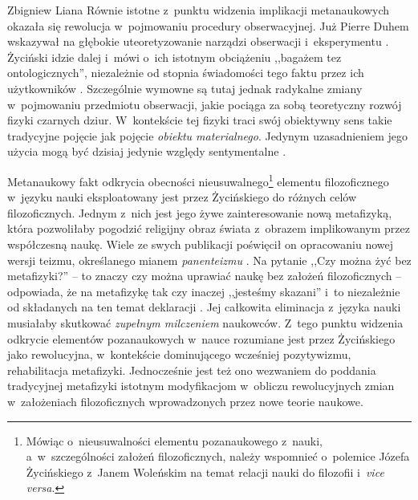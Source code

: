 \begin{artplenv}{Zbigniew Liana}
Równie istotne z~punktu widzenia implikacji metanaukowych okazała się rewolucja w~pojmowaniu procedury obserwacyjnej.
Już Pierre Duhem wskazywał na głębokie uteoretyzowanie narządzi obserwacji i~eksperymentu
\parencite[zob.][s.~77–81; 85–89]{duhem_pierre_1991}.
Życiński idzie dalej i~mówi o~ich istotnym
obciążeniu ,,bagażem tez ontologicznych'', niezależnie od stopnia świadomości tego faktu przez ich użytkowników
\parencite[s.~249]{zycinski_jezyk_1983}.
 Szczególnie wymowne są tutaj jednak radykalne zmiany w~pojmowaniu
przedmiotu obserwacji, jakie pociąga za sobą teoretyczny rozwój fizyki czarnych dziur. W~kontekście tej fizyki traci
swój obiektywny sens takie tradycyjne pojęcie jak pojęcie \textit{obiektu materialnego}. Jedynym uzasadnieniem jego
użycia mogą być dzisiaj jedynie względy sentymentalne
\parencites[s.~77]{zycinski_structure_1988}[s.~137n]{zycinski_struktura_2013}.

Metanaukowy fakt odkrycia obecności nieusuwalnego\footnote{Mówiąc o~nieusuwalności elementu
pozanaukowego z~nauki, a~w~szczególności założeń filozoficznych,
należy wspomnieć o~polemice Józefa Życińskiego
\parencite*{zycinski_czy_2009}
z~Janem Woleńskim
\parencite*{wolenski_odpowiedz_2009}
na temat relacji nauki do filozofii i~\textit{vice versa}.
} elementu
filozoficznego w~języku nauki eksploatowany jest przez Życińskiego do różnych celów filozoficznych. Jednym z~nich jest
jego żywe zainteresowanie nową metafizyką, która pozwoliłaby pogodzić religijny obraz świata z~obrazem implikowanym
przez współczesną naukę. Wiele ze swych publikacji poświęcił on opracowaniu nowej wersji teizmu, określanego mianem
\textit{panenteizmu} \parencite[zob. np.][]{zycinski_teizm_1988}.
Na pytanie ,,Czy można żyć bez metafizyki?'' -- to znaczy
czy można uprawiać naukę bez założeń filozoficznych -- odpowiada, że na metafizykę tak czy inaczej
,,jesteśmy skazani'' i~to niezależnie od składanych na ten temat
deklaracji
\parencite[s.~246.249]{zycinski_jezyk_1983}.
Jej całkowita eliminacja z~języka nauki musiałaby skutkować \textit{zupełnym milczeniem} naukowców. Z~tego punktu widzenia
odkrycie elementów pozanaukowych w~nauce rozumiane jest przez Życińskiego jako rewolucyjna, w~kontekście dominującego
wcześniej pozytywizmu, rehabilitacja metafizyki. Jednocześnie jest też ono wezwaniem do poddania tradycyjnej metafizyki
istotnym modyfikacjom w~obliczu rewolucyjnych zmian w~założeniach filozoficznych wprowadzonych przez nowe teorie
naukowe. 


\end{artplenv}
